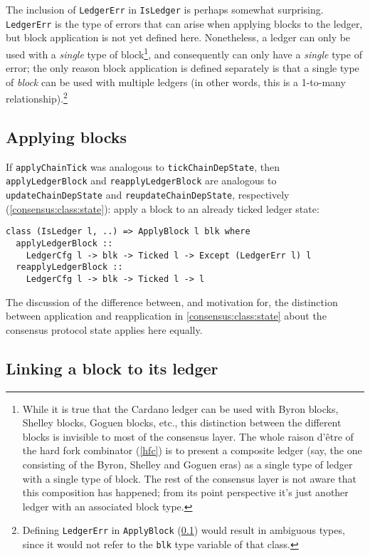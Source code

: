The inclusion of \lstinline!LedgerErr! in \lstinline!IsLedger! is perhaps
somewhat surprising. \lstinline!LedgerErr! is the type of errors that can arise
when applying blocks to the ledger, but block application is not yet defined
here. Nonetheless, a ledger can only be used with a \emph{single} type of
block\footnote{While it is true that the Cardano ledger can be used with Byron
blocks, Shelley blocks, Goguen blocks, etc., this distinction between the
different blocks is invisible to most of the consensus layer. The whole raison
d'\^{e}tre of the hard fork combinator (\cref{hfc}) is to present a composite
ledger (say, the one consisting of the Byron, Shelley and Goguen eras) as a
single type of ledger with a single type of block. The rest of the consensus
layer is not aware that this composition has happened; from its point
perspective it's just another ledger with an associated block type.}, and
consequently can only have a \emph{single} type of error; the only reason block
application is defined separately is that a single type of \emph{block} can be
used with multiple ledgers (in other words, this is a 1-to-many
relationship).\footnote{Defining \lstinline!LedgerErr! in \lstinline!ApplyBlock!
(\cref{ledger:api:ApplyBlock}) would result in ambiguous types, since it would
not refer to the \lstinline!blk! type variable of that class.}

\subsection{Applying blocks}
\label{ledger:api:ApplyBlock}

If \lstinline!applyChainTick! was analogous to \lstinline!tickChainDepState!,
then \lstinline!applyLedgerBlock! and \lstinline!reapplyLedgerBlock! are
analogous to \lstinline!updateChainDepState! and
\lstinline!reupdateChainDepState!, respectively
(\cref{consensus:class:state}): apply a block to an already ticked
ledger state:
%
\begin{lstlisting}
class (IsLedger l, ..) => ApplyBlock l blk where
  applyLedgerBlock ::
    LedgerCfg l -> blk -> Ticked l -> Except (LedgerErr l) l
  reapplyLedgerBlock ::
    LedgerCfg l -> blk -> Ticked l -> l
\end{lstlisting}
%
The discussion of the difference between, and motivation for, the distinction
between application and reapplication in \cref{consensus:class:state}
about the consensus protocol state applies here equally.

\subsection{Linking a block to its ledger}

